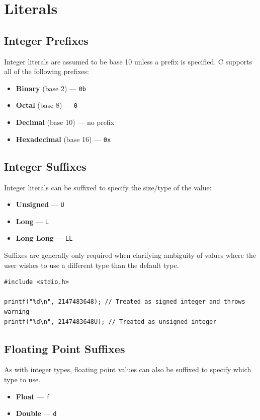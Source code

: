 \documentclass[a4paper]{report}
\begin{document}
\chapter{Literals}
\section{Integer Prefixes}
Integer literals are assumed to be base 10 unless a prefix is specified. C supports
all of the following prefixes:
\begin{itemize}
    \item \textbf{Binary} (base 2) --- \texttt{0b}
    \item \textbf{Octal} (base 8) --- \texttt{0}
    \item \textbf{Decimal} (base 10) --- no prefix
    \item \textbf{Hexadecimal} (base 16) --- \texttt{0x}
\end{itemize}
\section{Integer Suffixes}
Integer literals can be suffixed to specify the size/type of the value:
\begin{itemize}
    \item \textbf{Unsigned} --- \texttt{U}
    \item \textbf{Long} --- \texttt{L}
    \item \textbf{Long Long} --- \texttt{LL}
\end{itemize}
Suffixes are generally only required when clarifying ambiguity of values where the user wishes to use a different type than the default type.
\begin{verbatim}
#include <stdio.h>

printf("%d\n", 2147483648); // Treated as signed integer and throws warning
printf("%d\n", 2147483648U); // Treated as unsigned integer
\end{verbatim}
\section{Floating Point Suffixes}
As with integer types, floating point values can also be suffixed to specify which type to use.
\begin{itemize}
    \item \textbf{Float} --- \texttt{f}
    \item \textbf{Double} --- \texttt{d}
\end{itemize}
\end{document}
